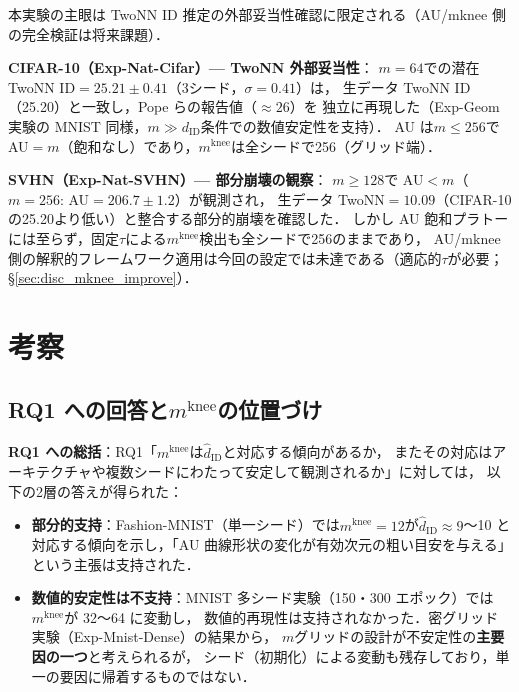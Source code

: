 \documentclass[11pt,a4paper]{jsarticle}
\newcommand{\mknee}{m^{\mathrm{knee}}}
\begin{document}
本実験の主眼は TwoNN ID 推定の外部妥当性確認に限定される（AU/mknee 側の完全検証は将来課題）．

\textbf{CIFAR-10（Exp-Nat-Cifar）— TwoNN 外部妥当性}：
$m=64$での潜在 TwoNN ID$=25.21\pm0.41$（3シード，$\sigma=0.41$）は，
生データ TwoNN ID（25.20）と一致し，Pope ら\cite{pope2021intrinsic}の報告値（$\approx 26$）を
独立に再現した（Exp-Geom 実験の MNIST 同様，$m \gg d_\mathrm{ID}$条件での数値安定性を支持）．
AU は$m \leq 256$で AU$=m$（飽和なし）であり，$\mknee$は全シードで256（グリッド端）．

\textbf{SVHN（Exp-Nat-SVHN）— 部分崩壊の観察}：
$m \geq 128$で AU$<m$（$m=256$: AU$=206.7\pm1.2$）が観測され，
生データ TwoNN$=10.09$（CIFAR-10の25.20より低い）と整合する部分的崩壊を確認した．
しかし AU 飽和プラトーには至らず，固定$\tau$による$\mknee$検出も全シードで256のままであり，
AU/mknee 側の解釈的フレームワーク適用は今回の設定では未達である（適応的$\tau$が必要；§\ref{sec:disc_mknee_improve}）．

\section{考察}\label{sec:discussion}

\subsection{RQ1 への回答と$\mknee$の位置づけ}\label{sec:disc_mknee}

\textbf{RQ1 への総括}：RQ1「$\mknee$は$\hat{d}_\mathrm{ID}$と対応する傾向があるか，
またその対応はアーキテクチャや複数シードにわたって安定して観測されるか」に対しては，
以下の2層の答えが得られた：

\begin{itemize}
  \item \textbf{部分的支持}：Fashion-MNIST（単一シード）では$\mknee = 12$が$\hat{d}_\mathrm{ID} \approx 9$〜10
        と対応する傾向を示し，「AU 曲線形状の変化が有効次元の粗い目安を与える」という主張は支持された．
  \item \textbf{数値的安定性は不支持}：MNIST 多シード実験（150・300 エポック）では$\mknee$が 32〜64 に変動し，
        数値的再現性は支持されなかった．密グリッド実験（Exp-Mnist-Dense）の結果から，
        $m$グリッドの設計が不安定性の\textbf{主要因の一つ}と考えられるが，
        シード（初期化）による変動も残存しており，単一の要因に帰着するものではない．
\end{itemize}
\end{document}
